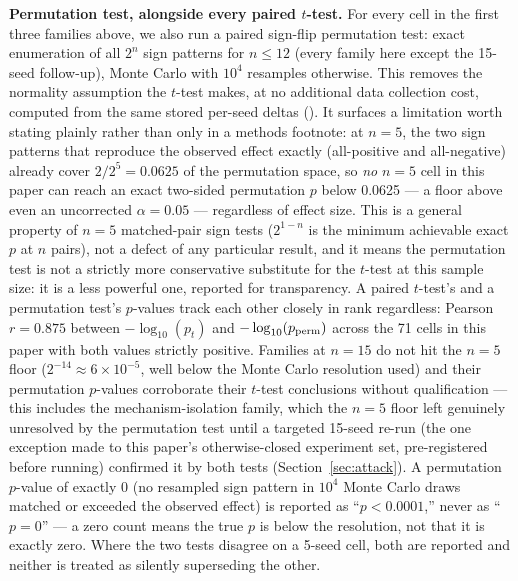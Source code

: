 \textbf{Permutation test, alongside every paired $t$-test.} For every cell in the first three
families above, we also run a paired sign-flip permutation test: exact enumeration of all $2^n$
sign patterns for $n\le12$ (every family here except the 15-seed follow-up), Monte Carlo with
$10^4$ resamples otherwise. This removes the normality assumption the $t$-test makes, at no
additional data collection cost, computed from the same stored per-seed deltas
(). It surfaces a limitation worth stating
plainly rather than only in a methods footnote: at $n=5$, the two sign patterns that reproduce
the observed effect exactly (all-positive and all-negative) already cover $2/2^5=0.0625$ of the
permutation space, so \emph{no} $n=5$ cell in this paper can reach an exact two-sided permutation
$p$ below 0.0625 — a floor above even an uncorrected $\alpha=0.05$ — regardless of effect size.
This is a general property of $n=5$ matched-pair sign tests ($2^{1-n}$ is the minimum achievable
exact $p$ at $n$ pairs), not a defect of any particular result, and it means the permutation test
is not a strictly more conservative substitute for the $t$-test at this sample size: it is a
less powerful one, reported for transparency. A paired $t$-test's and a permutation test's
$p$-values track each other closely in rank regardless: Pearson $r=0.875$ between
$-\log_{10}(p_t)$ and $-\log_{10}(p_{\rm perm})$ across the 71 cells in this paper with both
values strictly positive. Families at $n=15$ do not hit the $n=5$ floor
($2^{-14}\approx6\times10^{-5}$, well below the Monte Carlo resolution used) and their
permutation $p$-values corroborate their $t$-test conclusions without qualification — this
includes the mechanism-isolation family, which the $n=5$ floor left genuinely unresolved by the
permutation test until a targeted 15-seed re-run (the one exception made to this paper's
otherwise-closed experiment set, pre-registered before running) confirmed it by both tests
(Section~\ref{sec:attack}). A permutation $p$-value of exactly 0 (no resampled sign pattern in
$10^4$ Monte Carlo draws matched or exceeded the observed effect) is reported as
“$p<0.0001$,” never as “$p=0$” — a zero count means the true $p$ is below the resolution, not
that it is exactly zero. Where the two tests disagree on a 5-seed cell, both are reported and
neither is treated as silently superseding the other.
